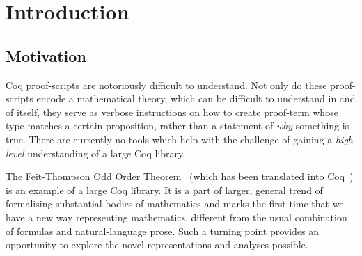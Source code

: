 \chapter{Introduction}\label{chap:intro}




\section{Motivation}

Coq proof-scripts are notoriously difficult to understand. Not only do these
proof-scripts encode a mathematical theory, which can be difficult to
understand in and of itself, they serve as verbose instructions on how to
create proof-term whose type matches a certain proposition, rather than a
statement of \emph{why} something is true. There are currently no tools which
help with the challenge of gaining a \emph{high-level} understanding of a large
Coq library.

The Feit-Thompson Odd Order Theorem~\cite{peterfalvi2000oot, bender1994oot}
(which has been translated into Coq~\cite{gonthier2013oot}) is an example of a
large Coq library. It is a part of larger, general trend of formalising
substantial bodies of mathematics and marks the first time that we have a new
way representing mathematics, different from the usual combination of formulas
and natural-language prose. Such a turning point provides an opportunity to
explore the novel representations and analyses possible.

